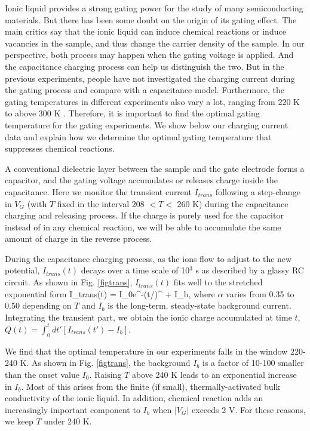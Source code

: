 Ionic liquid provides a strong gating power for the study of many semiconducting materials. But there has been some doubt on the origin of its gating effect. The main critics say that the ionic liquid can induce chemical reactions or induce vacancies in the sample\cite{ParkinVO2}, and thus change the carrier density of the sample. In our perspective, both process may happen when the gating voltage is applied. And the capacitance charging process can help us distinguish the two. But in the previous experiments, people have not investigated the charging current during the gating process and compare with a capacitance model. Furthermore, the gating temperatures in different experiments also vary a lot, ranging from 220 K\cite{Yuan2011} to above 300 K \cite{ParkinVO2}. Therefore, it is important to find the optimal gating temperature for the gating experiments. We show below our charging current data and explain how we determine the optimal gating temperature that suppresses chemical reactions.

A conventional dielectric layer between the sample and the gate electrode forms a capacitor, and the gating voltage accumulates or releases charge inside the capacitance. Here we monitor the transient current $I_{trans}$ following a step-change in $V_G$ (with $T$ fixed in the interval 208 $<T<$ 260 K) during the capacitance charging and releasing process. If the charge is purely used for the capacitor instead of in any chemical reaction, we will be able to accumulate the same amount of charge in the reverse process.

During the capacitance charging process, as the ions flow to adjust to the new potential, $I_{trans}(t)$ decays over a time scale of 10$^3$ s as described by a glassy RC circuit. 
As shown in Fig. \ref{figtrans}, $I_{trans}(t)$ fits well to the stretched exponential form
\be
I_{trans}(t) = I_0{\rm e}^{-(t/\tau)^\alpha} + I_b,
\label{Itrans}
\ee
where $\alpha$ varies from 0.35 to 0.50 depending on $T$ and $I_b$ is the long-term, steady-state
background current. Integrating the transient part, we obtain the ionic charge accumulated at time $t$,
$Q(t) = \int^{t}_0 dt' [I_{trans}(t') - I_b]$.

We find that the optimal temperature in our experiments falls in the window
220-240 K. As shown in Fig. \ref{figtrans}, the background $I_b$ is a factor of 10-100 smaller than
the onset value $I_0$. Raising $T$ above 240 K leads to an exponential increase in $I_b$. 
Most of this arises from the finite (if small), thermally-activated bulk conductivity of the ionic liquid.
In addition, chemical reaction adds an increasingly important component to $I_b$ when
$|V_G|$ exceeds 2 V. For these reasons, we keep $T$ under 240 K.

